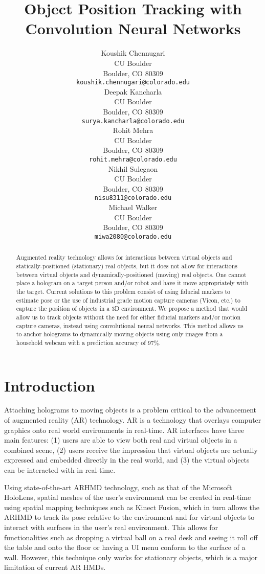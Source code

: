 \documentclass{article}
\title{Object Position Tracking with Convolution Neural Networks}
\author{
  Koushik Chennugari\\
  CU Boulder\\
  Boulder, CO 80309 \\
  \texttt{koushik.chennugari@colorado.edu} \\
  \And
  Deepak Kancharla\\
  CU Boulder\\
  Boulder, CO 80309 \\
  \texttt{surya.kancharla@colorado.edu} \\
  \And
  Rohit Mehra\\
  CU Boulder\\
  Boulder, CO 80309 \\
  \texttt{rohit.mehra@colorado.edu} \\
  \And
  Nikhil Sulegaon\\
  CU Boulder\\
  Boulder, CO 80309 \\
  \texttt{nisu8311@colorado.edu} \\
  \And
  Michael Walker\\
  CU Boulder\\
  Boulder, CO 80309 \\
  \texttt{miwa2080@colorado.edu} \\
}
\begin{document}

\maketitle

\begin{abstract}
Augmented reality technology allows for interactions between virtual objects and statically-positioned (stationary) real objects, but it does not allow for interactions between virtual objects and dynamically-positioned (moving) real objects. One cannot place a hologram on a target person and/or robot and have it move appropriately with the target. Current solutions to this problem consist of using fiducial markers to estimate pose or the use of industrial grade motion capture cameras (Vicon, etc.) to capture the position of objects in a 3D environment. We propose a method that would allow us to track objects without the need for either fiducial markers and/or motion capture cameras, instead using convolutional neural networks. This method allows us to anchor holograms to dynamically moving objects using only images from a household webcam with a prediction accuracy of 97\%.
\end{abstract}

\section{Introduction}

Attaching holograms to moving objects is a problem critical to the advancement of augmented reality (AR) technology. AR is a technology that overlays computer graphics onto real world environments in real-time. AR interfaces have three main features: (1) users are able to view both real and virtual objects in a combined scene, (2) users receive the impression that virtual objects are actually expressed and embedded directly in the real world, and (3) the virtual objects can be interacted with in real-time.

Using state-of-the-art ARHMD technology, such as that of the Microsoft HoloLens, spatial meshes of the user’s environment can be created in real-time using spatial mapping techniques such as Kinect Fusion, which in turn allows the ARHMD to track its pose relative to the environment and for virtual objects to interact with surfaces in the user’s real environment. This allows for functionalities such as dropping a virtual ball on a real desk and seeing it roll off the table and onto the floor or having a UI menu conform to the surface of a wall. However, this technique only works for stationary objects, which is a major limitation of current AR HMDs.
\end{document}
